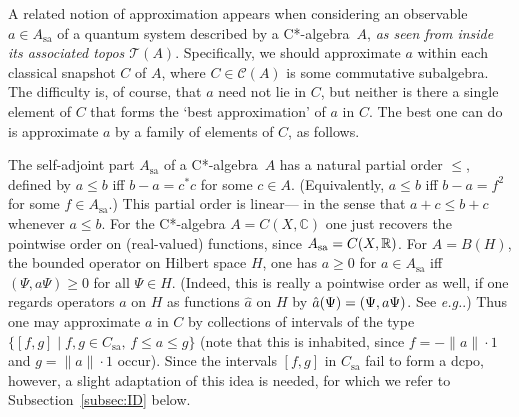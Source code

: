 \documentclass[12pt]{article}
\newcommand{\ca}{C*-algebra} \newcommand{\jba}{JB-algebra}
\newcommand{\C}{{\mathbb C}} \newcommand{\D}{{\mathbb D}}
\newcommand{\asstopos}{\ensuremath{\mathcal{T}}}
\newcommand{\sa}{\ensuremath{_{\mathrm{sa}}}}
\newcommand{\eg}{\textit{e.g.}}
\begin{document}
A related notion of approximation  appears
when considering an observable $a \in A\sa$ of a quantum system described by a
\ca\ $A$,
{\it as seen from inside its associated topos
$\asstopos(A)$}. Specifically, we should approximate $a$ within
 each  classical snapshot $C$ of $A$, where $C\in \mathcal{C}(A)$ is some
 commutative subalgebra. The difficulty is, of course, that
$a$ need not lie in $C$, but neither is there a single element of $C$ that forms
the `best approximation' of $a$ in $C$. The best one can do is
approximate $a$ by a family of elements of $C$, as follows. 

The self-adjoint part $A\sa$ of a \ca\ $A$ has a natural
 partial order $\leqslant$, defined
 by $a\leqslant b$ iff $b-a=c^*c$ for some $c\in A$. (Equivalently, $a\leqslant
 b$ iff $b-a=f^2$ for some $f\in A\sa$.) This partial order is linear---
 in the sense that $a+c\leqslant b+c$ whenever $a \leqslant b$.  For the
 C*-algebra $A=C(X,\C)$ one just recovers the pointwise order on
 (real-valued) functions, since $A\sa=C(X,\R)$.
 For $A=B(H)$, the
 bounded operator on Hilbert space $H$, one has $a\geq 0$ for $a\in
 A\sa$ iff $(\Psi,a\Psi)\geq 0$ for all $\Psi\in H$. (Indeed, this is
 really a pointwise order as well, if one regards operators $a$ on $H$
 as functions $\hat{a}$ on  $H$
 by $\hat{a}(\Psi)=(\Psi,a\Psi)$. See \eg\cite{landsman98}.) Thus one may
approximate $a$ in $C$ by collections of intervals of the type
 $\{[f,g]\mid f,g \in C\sa,\, f\leqslant a\leqslant g\}$ (note that this is
 inhabited, since $f=-\|a\|\cdot 1$ and $g=\|a\|\cdot 1$ occur). Since
 the intervals $[f,g]$ in $C\sa$ fail to form a dcpo, however, a
 slight adaptation of this idea is needed, for which we refer to
 Subsection~\ref{subsec:ID} below.
\end{document}
